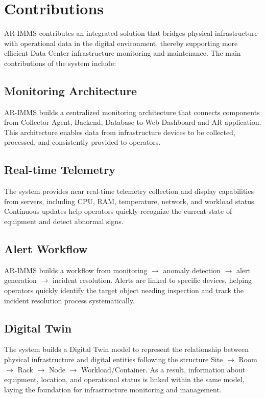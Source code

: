 \section{Contributions}\label{s:contributions}

AR-IMMS contributes an integrated solution that bridges physical infrastructure with operational data in the digital environment, thereby supporting more efficient Data Center infrastructure monitoring and maintenance. The main contributions of the system include:

\subsection{Monitoring Architecture}
AR-IMMS builds a centralized monitoring architecture that connects components from Collector Agent, Backend, Database to Web Dashboard and AR application. This architecture enables data from infrastructure devices to be collected, processed, and consistently provided to operators.

\subsection{Real-time Telemetry}
The system provides near real-time telemetry collection and display capabilities from servers, including CPU, RAM, temperature, network, and workload status. Continuous updates help operators quickly recognize the current state of equipment and detect abnormal signs.

\subsection{Alert Workflow}
AR-IMMS builds a workflow from monitoring $\rightarrow$ anomaly detection $\rightarrow$ alert generation $\rightarrow$ incident resolution. Alerts are linked to specific devices, helping operators quickly identify the target object needing inspection and track the incident resolution process systematically.

\subsection{Digital Twin}
The system builds a Digital Twin model to represent the relationship between physical infrastructure and digital entities following the structure Site $\rightarrow$ Room $\rightarrow$ Rack $\rightarrow$ Node $\rightarrow$ Workload/Container. As a result, information about equipment, location, and operational status is linked within the same model, laying the foundation for infrastructure monitoring and management.

